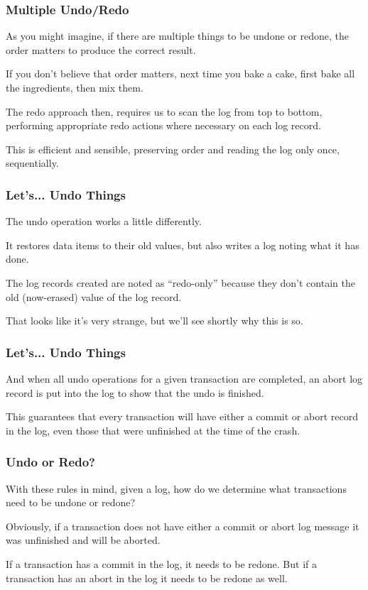 \begin{frame}
\frametitle{Multiple Undo/Redo}
As you might imagine, if there are multiple things to be undone or redone, the order matters to produce the correct result. 

If you don't believe that order matters, next time you bake a cake, first bake all the ingredients, then mix them. 

The redo approach then, requires us to scan the log from top to bottom, performing appropriate redo actions where necessary on each log record. 

This is efficient and sensible, preserving order and reading the log only once, sequentially.

\end{frame}

\begin{frame}
\frametitle{Let's... Undo Things}

The undo operation works a little differently. 

It restores data items to their old values, but also writes a log noting what it has done. 

The log records created are noted as ``redo-only'' because they don't contain the old (now-erased) value of the log record.

That looks like it's very strange, but we'll see shortly why this is so.

\end{frame}



\begin{frame}
\frametitle{Let's... Undo Things}

And when all undo operations for a given transaction are completed, an abort log record is put into the log to show that the undo is finished. 

This guarantees that every transaction will have either a commit or abort record in the log, even those that were unfinished at the time of the crash.

\end{frame}


\begin{frame}
\frametitle{Undo or Redo?}

With these rules in mind, given a log, how do we determine what transactions need to be undone or redone? 

Obviously, if a transaction does not have either a commit or abort log message it was unfinished and will be aborted. 

If a transaction has a commit in the log, it needs to be redone. But if a transaction has an abort in the log it needs to be redone as well.

\end{frame}

